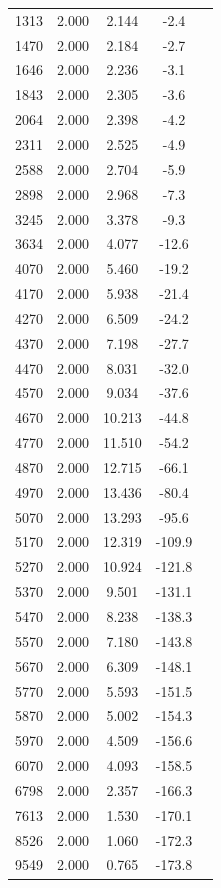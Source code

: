 \begin{longtable}{
  S[table-format=6.0]
  S[table-format=2.3]
  S[table-format=2.3]
  S[table-format=+3.1]
  c}
  1313 & 2.000 & 2.144 & -2.4 & \\
  1470 & 2.000 & 2.184 & -2.7 & \\
  1646 & 2.000 & 2.236 & -3.1 & \\
  1843 & 2.000 & 2.305 & -3.6 & \\
  2064 & 2.000 & 2.398 & -4.2 & \\
  2311 & 2.000 & 2.525 & -4.9 & \\
  2588 & 2.000 & 2.704 & -5.9 & \\
  2898 & 2.000 & 2.968 & -7.3 & \\
  3245 & 2.000 & 3.378 & -9.3 & \\
  3634 & 2.000 & 4.077 & -12.6 & \\
  4070 & 2.000 & 5.460 & -19.2 & \\
  4170 & 2.000 & 5.938 & -21.4 & \\
  4270 & 2.000 & 6.509 & -24.2 & \\
  4370 & 2.000 & 7.198 & -27.7 & \\
  4470 & 2.000 & 8.031 & -32.0 & \\
  4570 & 2.000 & 9.034 & -37.6 & \\
  4670 & 2.000 & 10.213 & -44.8 & \\
  4770 & 2.000 & 11.510 & -54.2 & \\
  4870 & 2.000 & 12.715 & -66.1 & \\
  4970 & 2.000 & 13.436 & -80.4 & \\
  5070 & 2.000 & 13.293 & -95.6 & \\
  5170 & 2.000 & 12.319 & -109.9 & \\
  5270 & 2.000 & 10.924 & -121.8 & \\
  5370 & 2.000 & 9.501 & -131.1 & \\
  5470 & 2.000 & 8.238 & -138.3 & \\
  5570 & 2.000 & 7.180 & -143.8 & \\
  5670 & 2.000 & 6.309 & -148.1 & \\
  5770 & 2.000 & 5.593 & -151.5 & \\
  5870 & 2.000 & 5.002 & -154.3 & \\
  5970 & 2.000 & 4.509 & -156.6 & \\
  6070 & 2.000 & 4.093 & -158.5 & \\
  6798 & 2.000 & 2.357 & -166.3 & \\
  7613 & 2.000 & 1.530 & -170.1 & \\
  8526 & 2.000 & 1.060 & -172.3 & \\
  9549 & 2.000 & 0.765 & -173.8 & \\

\end{longtable}
